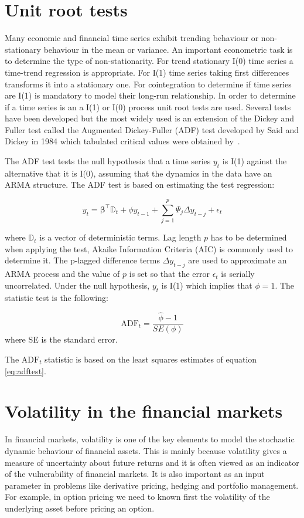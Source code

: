 \section{Unit root tests}
Many economic and financial time series exhibit trending behaviour or
non-stationary behaviour in the mean or variance. An important econometric task
is to determine the type of non-stationarity. For trend stationary I(0) time
series a time-trend regression is appropriate. For I(1) time series taking first
differences transforms it into a stationary one.  For cointegration to determine
if time series are I(1) is mandatory to model their long-run relationship. In
order to determine if a time series is an a I(1) or I(0) process unit root tests
are used. Several tests have been developed but the most widely used is an
extension of the Dickey and Fuller test \cite{dickey1979} called the Augmented
Dickey-Fuller (ADF) test developed by Said and Dickey in 1984 \cite{said1984}
which tabulated critical values were obtained by~\cite{mackinnon2010}. 

The ADF test tests the null hypothesis that a time series $y_t$ is I(1) against
the alternative that it is I(0), assuming that the dynamics in the data have an
ARMA structure. The ADF test is based on estimating the test regression:

\begin{equation}
\label{eq:adftest}
y_t = \boldsymbol{\beta}^\top \mathbb{D}_t + \phi y_{t-1} + \sum_{j=1}^p \Psi_j \Delta y_{t-j} + \epsilon_t
\end{equation}

\noindent where $\mathbb{D}_t$ is a vector of deterministic terms. Lag length
$p$ has to be determined when applying the test, Akaike Information Criteria
(AIC) is commonly used to determine it.  The p-lagged difference terms $\Delta
y_{t-j}$ are used to approximate an ARMA process and the value of $p$ is set so
that the error $\epsilon_t$ is serially uncorrelated. Under the null hypothesis,
$y_t$ is I(1) which implies that $\phi=1$. The statistic test is the following:

\[
\text{ADF}_t = \frac{\hat{\phi} -1}{SE(\phi)}
\]
\noindent where SE is the standard error.

The $\text{ADF}_t$ statistic is based on the least squares estimates of equation \ref{eq:adftest}.


\vfill

\section{Volatility in the financial markets}
In financial markets, volatility is one of the key elements to model the
stochastic dynamic behaviour of financial assets. This is mainly because
volatility gives a measure of uncertainty about future returns and it is often
viewed as an indicator of the vulnerability of financial markets. It is also
important as an input parameter in problems like derivative pricing, hedging
and portfolio management.  For example, in option pricing we need to known
first the volatility of the underlying asset before pricing an option. 

